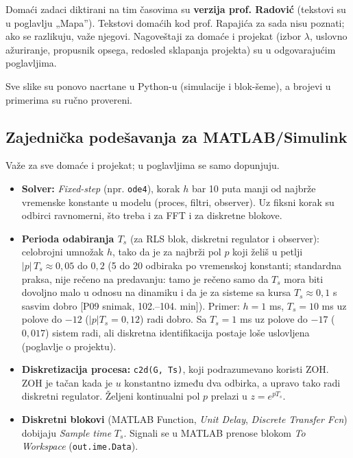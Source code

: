 \documentclass[11pt,a4paper,parskip=half,headsepline,numbers=noenddot]{scrartcl}
\DeclareRobustCommand{\izvor}[1]{{\small\color{izvorC}[#1]}}
\begin{document}
Domaći zadaci diktirani na tim časovima su \textbf{verzija prof. Radović} (tekstovi su u poglavlju „Mapa''). Tekstovi domaćih kod prof. Rapajića za sada nisu poznati; ako se razlikuju, važe njegovi. Nagoveštaji za domaće i projekat (izbor \(\lambda\), uslovno ažuriranje, propusnik opsega, redosled sklapanja projekta) su u odgovarajućim poglavljima.

Sve slike su ponovo nacrtane u Python-u (simulacije i blok-šeme), a brojevi u primerima su ručno provereni.

\subsection{Zajednička podešavanja za MATLAB/Simulink}

Važe za sve domaće i projekat; u poglavljima se samo dopunjuju.

\begin{itemize}
\item \textbf{Solver:} \emph{Fixed-step} (npr. \texttt{ode4}), korak \(h\) bar 10 puta manji od najbrže vremenske konstante u modelu (proces, filtri, observer). Uz fiksni korak su odbirci ravnomerni, što treba i za FFT i za diskretne blokove.
\item \textbf{Perioda odabiranja \(T_s\)} (za RLS blok, diskretni regulator i observer): celobrojni umnožak \(h\), tako da je za najbrži pol \(p\) koji želiš u petlji \(|p|\,T_s \approx 0{,}05\) do \(0{,}2\) (5 do 20 odbiraka po vremenskoj konstanti; standardna praksa, nije rečeno na predavanju: tamo je rečeno samo da \(T_s\) mora biti dovoljno malo u odnosu na dinamiku i da je za sisteme sa kursa \(T_s \approx 0{,}1\) s sasvim dobro \izvor{P09 snimak, 102.--104. min}). Primer: \(h = 1\) ms, \(T_s = 10\) ms uz polove do \(-12\) (\(|p|T_s = 0{,}12\)) radi dobro. Sa \(T_s = 1\) ms uz polove do \(-17\) (\(0{,}017\)) sistem radi, ali diskretna identifikacija postaje loše uslovljena (poglavlje o projektu).
\item \textbf{Diskretizacija procesa:} \texttt{c2d(\allowbreak{}G,\allowbreak{}\ Ts)}, koji podrazumevano koristi ZOH. ZOH je tačan kada je \(u\) konstantno između dva odbirka, a upravo tako radi diskretni regulator. Željeni kontinualni pol \(p\) prelazi u \(z = e^{pT_s}\).
\item \textbf{Diskretni blokovi} (MATLAB Function, \emph{Unit Delay}, \emph{Discrete Transfer Fcn}) dobijaju \emph{Sample time} \(T_s\). Signali se u MATLAB prenose blokom \emph{To Workspace} (\texttt{out.ime.Data}).
\end{itemize}
\end{document}
